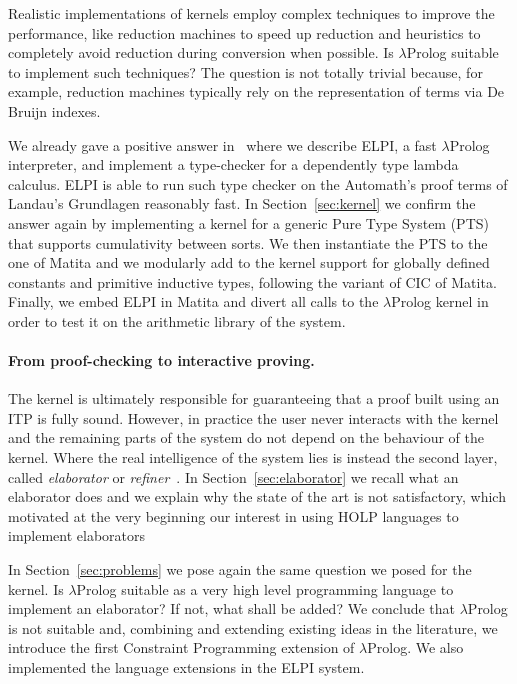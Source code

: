 \documentclass{easychair}
\begin{document}
Realistic implementations of kernels employ complex techniques to improve the performance, like reduction machines to speed up reduction and heuristics to completely avoid reduction during conversion when possible. Is $\lambda$Prolog suitable to implement such techniques? The question is not totally trivial because, for example, reduction machines typically rely on the representation of terms via De Bruijn indexes.

We already gave a positive answer in~\cite{elpiLPAR} where we describe
ELPI, a fast $\lambda$Prolog interpreter, and implement 
a type-checker for a dependently type lambda calculus.
ELPI is able to run such type checker on the Automath's proof terms of
Landau's Grundlagen reasonably fast.
In Section~\ref{sec:kernel} we confirm the answer again by implementing a
kernel for a generic Pure Type System (PTS) that supports cumulativity between
sorts. We then instantiate the PTS to the one of Matita and we
modularly add to the kernel support for globally defined constants and
primitive inductive types, following the variant of CIC of Matita. Finally, we embed ELPI in Matita and divert all calls
to the $\lambda$Prolog kernel in order to test it on the arithmetic
library of the system.

\paragraph{From proof-checking to interactive proving.}

The kernel is ultimately responsible for guaranteeing that a proof
built using an ITP is fully sound. However, in practice the user never
interacts with the kernel and the remaining parts of the system do not
depend on the behaviour of the kernel. Where the real intelligence of
the system lies is instead the second layer, called \emph{elaborator}
or \emph{refiner}~\cite{leanelaborator,bidir}.
In Section~\ref{sec:elaborator} we recall what an elaborator does and we explain why the state of the art is not satisfactory, which motivated at the very beginning our interest in using HOLP languages to implement elaborators

In Section~\ref{sec:problems} we pose again the same question we posed for the kernel. Is $\lambda$Prolog suitable as a very high level programming language to implement an elaborator? If not, what shall be added? We conclude that $\lambda$Prolog is not suitable and, combining and extending existing ideas in the literature, we introduce the first Constraint Programming extension of $\lambda$Prolog. We also implemented the language extensions in the ELPI system.
\end{document}
